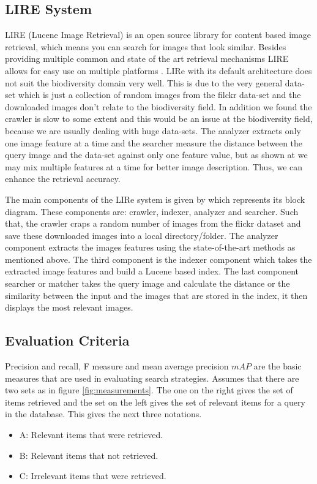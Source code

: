 \documentclass[11pt]{article}
\begin{document}
\subsection{LIRE System}

LIRE (Lucene Image Retrieval) is an open source library for content based image retrieval, which means you can search for images that look similar. Besides providing multiple common and state of the art retrieval mechanisms LIRE allows for easy use on multiple platforms \cite{lux2011content}. LIRe with its default architecture does not suit the biodiversity domain very well. This is due to the very general data-set which is just a collection of random images from the filckr data-set and the downloaded images don't relate to the biodiversity field. In addition we found the crawler is slow to some extent and this would be an issue at the biodiversity field, because we are usually dealing with huge data-sets. The analyzer extracts only one image feature at a time and the searcher measure the distance between the query image and the data-set against only one feature value, but as shown at \cite{ping2013review, won2002efficient, park2000efficient, won2004feature} we may mix multiple features at a time for better image description. Thus, we can enhance the retrieval accuracy.

The main components of the LIRe system is given by  which represents its block diagram. These components are: crawler, indexer, analyzer and searcher. Such that, the crawler craps a random number of images from the flickr dataset and save these downloaded images into a local directory/folder. The analyzer component extracts the images features using the state-of-the-art methods as mentioned above. The third component is the indexer component which takes the extracted image features and build a Lucene based index. The last component searcher or matcher takes the query image and calculate the distance or the similarity between the input and the images that are stored in the index, it then displays the most relevant images.

\subsection{Evaluation Criteria}

Precision and recall, F measure and mean average precision $mAP$ are the basic measures that are used in evaluating search strategies. Assumes that there are two sets as in figure \ref{fig:measurements}. The one on the right gives the set of items retrieved and the set on the left gives the set of relevant items for a query in the database. This gives the next three notations.
\begin{itemize}
\item{A: Relevant items that were retrieved. }
\item{B: Relevant items that not retrieved. }
\item{C: Irrelevant items that were retrieved. }
\end{itemize}
\end{document}
